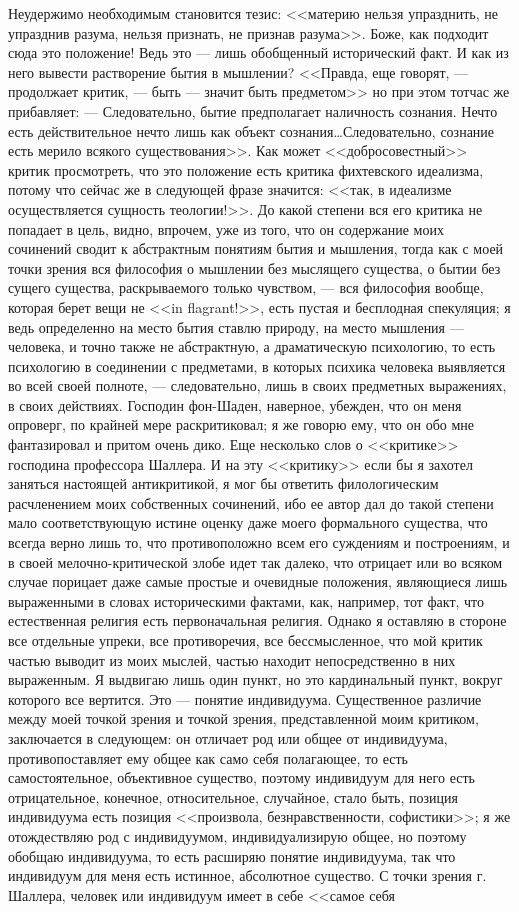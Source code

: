 \documentclass[12pt]{article}
\begin{document}
Неудержимо необходимым становится тезис: <<материю нельзя упразднить, не упразднив разума, нельзя признать, не признав разума>>. Боже, как подходит сюда это положение! Ведь это --- лишь обобщенный исторический факт. И как из него вывести растворение бытия в мышлении? <<Правда, еще говорят, --- продолжает критик, --- быть --- значит быть предметом>>  но при этом тотчас же прибавляет: --- Следовательно, бытие предполагает наличность сознания. Нечто есть действительное нечто лишь как объект сознания\dots Следовательно, сознание есть мерило всякого существования>>. Как может <<добросовестный>> критик просмотреть, что это положение есть критика фихтевского идеализма, потому что сейчас же в следующей фразе значится: <<так, в идеализме осуществляется сущность теологии!>>. До какой степени вся его критика не попадает в цель, видно, впрочем, уже из того, что он содержание моих сочинений сводит к абстрактным понятиям бытия и мышления, тогда как с моей точки зрения вся философия о мышлении без мыслящего существа, о бытии без сущего существа, раскрываемого только чувством, --- вся философия вообще, которая берет вещи не <<in flagrant!>>, есть пустая и бесплодная спекуляция; я ведь определенно на место бытия ставлю природу, на место мышления --- человека, и точно также не абстрактную, а драматическую психологию, то есть психологию в соединении с предметами, в которых психика человека выявляется во всей своей полноте, --- следовательно, лишь в своих предметных выражениях, в своих действиях. Господин фон-Шаден, наверное, убежден, что он меня опроверг, по крайней мере раскритиковал; я же говорю ему, что он обо мне фантазировал и притом очень дико. Еще несколько слов о <<критике>> господина профессора Шаллера. И на эту <<критику>>  если бы я захотел заняться настоящей антикритикой, я мог бы ответить филологическим расчленением моих собственных сочинений, ибо ее автор дал до такой степени мало соответствующую истине оценку даже моего формального существа, что всегда верно лишь то, что противоположно всем его суждениям и построениям, и в своей мелочно-критической злобе идет так далеко, что отрицает или во всяком случае порицает даже самые простые и очевидные положения, являющиеся лишь выраженными в словах историческими фактами, как, например, тот факт, что естественная религия есть первоначальная религия. Однако я оставляю в стороне все отдельные упреки, все противоречия, все бессмысленное, что мой критик частью выводит из моих мыслей, частью находит непосредственно в них выраженным. Я выдвигаю лишь один пункт, но это кардинальный пункт, вокруг которого все вертится. Это --- понятие индивидуума. Существенное различие между моей точкой зрения и точкой зрения, представленной моим критиком, заключается в следующем: он отличает род или общее от индивидуума, противопоставляет ему общее как само себя полагающее, то есть самостоятельное, объективное существо, поэтому индивидуум для него есть отрицательное, конечное, относительное, случайное, стало быть, позиция индивидуума есть позиция <<произвола, безнравственности, софистики>>; я же отождествляю род с индивидуумом, индивидуализирую общее, но поэтому обобщаю индивидуума, то есть расширяю понятие индивидуума, так что индивидуум для меня есть истинное, абсолютное существо. С точки зрения г. Шаллера, человек или индивидуум имеет в себе <<самое себя 
\end{document}
